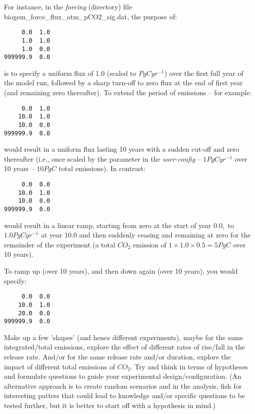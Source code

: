 \documentclass[11pt,fleqn]{book} %
\begin{document}
For instance, in the \textit{forcing} (directory) file \footnotesize\textsf{biogem\_force\_flux\_atm\_pCO2\_sig.dat}\normalsize, the purpose of:
\vspace{-2pt}\small\begin{verbatim}
     0.0  1.0
     1.0  1.0
     1.0  0.0
999999.9  0.0
\end{verbatim}\normalsize\vspace{-2pt}
is to specify a uniform flux of 1.0 (scaled to \(PgC yr^{-1}\)) over the first full year of the model run, followed by a sharp turn-off to zero flux at the end of first year (and remaining zero thereafter). To extend the period of emissions – for example:
\vspace{-2pt}\small\begin{verbatim}
     0.0  1.0
    10.0  1.0
    10.0  0.0
999999.9  0.0
\end{verbatim}\normalsize\vspace{-2pt}
would result in a uniform flux lasting 10 years with a sudden cut-off and zero thereafter (i.e., once scaled by the parameter in the \textit{user-config} – \(1 PgC yr^{-1}\) over 10 years – \(10 PgC\) total emissions). In contrast:
\vspace{-2pt}\small\begin{verbatim}
     0.0  0.0
    10.0  1.0
    10.0  0.0
999999.9  0.0
\end{verbatim}\normalsize\vspace{-2pt}
would result in a linear ramp, starting from zero at the start of year \(0.0,\) to \(1.0 PgC yr^{-1}\) at year \(10.0\) and then suddenly ceasing and remaining at zero for the remainder of the experiment (a total \(CO_{2}\) emission of \(1\times1.0\times0.5 = 5PgC\) over 10 years).

To ramp up (over 10 years), and then down again (over 10 years), you would specify:
\vspace{-2pt}\small\begin{verbatim}
     0.0  0.0
    10.0  1.0
    20.0  0.0
999999.9  0.0
\end{verbatim}\normalsize\vspace{-2pt}

Make up a few 'shapes' (and hence different experiments), maybe for the same integrated/total emissions, explore the effect of different rates of rise/fall in the release rate. And/or for the same release rate and/or duration, explore the impact of different total emissions of \(CO_{2}\). Try and think in terms of hypotheses and formulate questions to guide your experimental design/configuration. (An alternative approach is to create random scenarios and in the analysis, fish for interesting patters that could lead to knowledge and/or specific questions to be tested further, but it is better to start off with a hypothesis in mind.)
\end{document}

